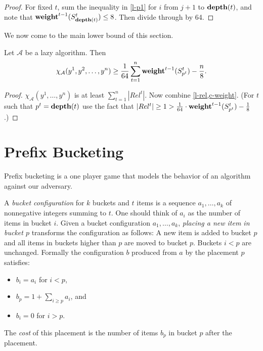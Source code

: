 \documentclass[unicode,review]{siamart1116}
\newcommand{\A}{\mathcal{A}}
\newcommand{\weight}{{\rm {\bf weight}}}
\newcommand{\depth}{{\rm {\bf depth}}}
\numberwithin{theorem}{section}
\begin{document}
\begin{proof}
For fixed $t$, sum the inequality in \cref{l-p1} for $i$ from $j+1$ to $\depth(t)$, and note that
$\weight^{t-1}(S^t_{\depth(t)}) \leq 8$.  Then divide through by 64.
\end{proof}


We now come to the main lower bound of this section.


\begin{corollary}\label{c-main}
Let $\A$ be a lazy algorithm. Then 
$$ \chi_\A(y^1,y^2,\dotsc,y^n)  \ge \frac{1}{64} \sum_{t=1}^n \weight^{t-1}(S^t_{p^t}) - \frac{n}{8}.$$
\end{corollary}

\begin{proof}
$\chi_\A(y^1,\ldots,y^n)$ is at least $\sum_{t=1}^n |Rel^t|$. Now combine \cref{l-rel,c-weight}. (For $t$ such that $p^t=\depth(t)$ use the fact that $|Rel^t|\geq 1> \frac{1}{64} \cdot \weight^{t-1}(S^t_{p^t}) - \frac{1}{8}$.)
\end{proof}


\section{Prefix Bucketing}
\label{s-pb}

Prefix bucketing is a one player game that models the behavior of an algorithm against our adversary.

A {\em  bucket configuration} for $k$ buckets and $t$ items  is a sequence $a_1,\ldots,a_k$ of nonnegative integers
summing to $t$.  One should think of $a_i$ as the number of items in bucket $i$.
Given a bucket configuration
$a_1,\ldots,a_k$, {\em placing a new item in bucket $p$} transforms  the configuration as follows:
A new item is added to bucket $p$ and all items in buckets higher than $p$ are moved to bucket $p$.
Buckets $i < p$ are unchanged.  Formally the configuration $b$ produced from $a$ by the placement $p$ satisfies:

\begin{itemize}
\item $b_i=a_i$ for $i < p$,
\item $b_p=1+\sum_{i \geq p} a_i$, and
\item $b_i=0$ for $i>p$.
\end{itemize}
The {\em cost} of this placement  is the number of items $b_p$ in bucket $p$ after the placement.
\end{document}
